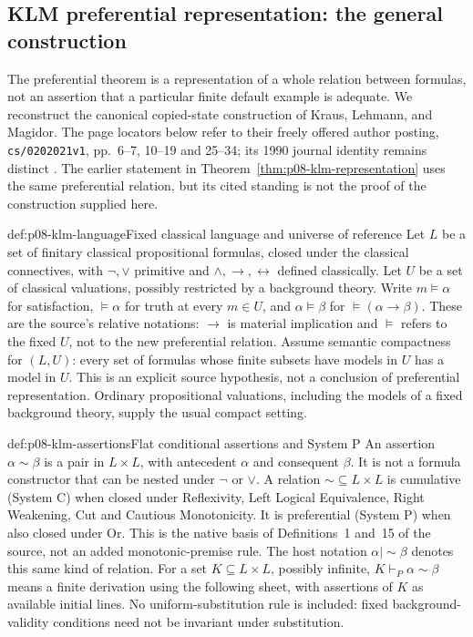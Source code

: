 \subsection{KLM preferential representation: the general construction}
\label{sec:p08-klm-preferential-representation}

The preferential theorem is a representation of a whole relation between
formulas, not an assertion that a particular finite default example is
adequate. We reconstruct the canonical copied-state construction of
Kraus, Lehmann, and Magidor. The page locators below refer to their freely
offered author posting, \texttt{cs/0202021v1}, pp.~6--7, 10--19 and
25--34; its 1990 journal identity remains distinct
\cite{KrausLehmannMagidor1990,KrausLehmannMagidor2002Author}.
The earlier statement in Theorem~\ref{thm:p08-klm-representation} uses
the same preferential relation, but its cited standing is not the proof
of the construction supplied here.

\begin{hbdefinition}{def:p08-klm-language}{Fixed classical language and universe of reference}
Let \(L\) be a set of finitary classical propositional formulas, closed
under the classical connectives, with \(\neg,\vee\) primitive and
\(\wedge,\to,\leftrightarrow\) defined classically. Let \(U\) be a
set of classical valuations, possibly restricted by a background theory.
Write \(m\models\alpha\) for satisfaction, \(\models\alpha\) for
truth at every \(m\in U\), and \(\alpha\models\beta\) for
\(\models(\alpha\to\beta)\). These are the source's relative
notations: \(\to\) is material implication and \(\models\) refers
to the fixed \(U\), not to the new preferential relation.
Assume semantic compactness for \((L,U)\): every set of formulas whose
finite subsets have models in \(U\) has a model in \(U\).
This is an explicit source hypothesis, not a conclusion of preferential
representation. Ordinary propositional valuations, including the models
of a fixed background theory, supply the usual compact setting.
\end{hbdefinition}

\begin{hbdefinition}{def:p08-klm-assertions}{Flat conditional assertions and System P}
An assertion \(\alpha\sim\beta\) is a pair in \(L\times L\),
with antecedent \(\alpha\) and consequent \(\beta\). It is not a
formula constructor that can be nested under \(\neg\) or \(\vee\).
A relation \(\sim\subseteq L\times L\) is cumulative (System C)
when closed under Reflexivity, Left Logical Equivalence, Right Weakening,
Cut and Cautious Monotonicity. It is preferential (System P) when also
closed under Or. This is the native basis of Definitions~1 and~15 of
the source, not an added monotonic-premise rule. The host notation
\(\alpha\mathrel{|\!\sim}\beta\) denotes this same kind of relation.
For a set \(K\subseteq L\times L\), possibly infinite,
\(K\vdash_P\alpha\sim\beta\) means a finite derivation using the
following sheet, with assertions of \(K\) as available initial lines.
No uniform-substitution rule is included: fixed background-validity
conditions need not be invariant under substitution.
\end{hbdefinition}

